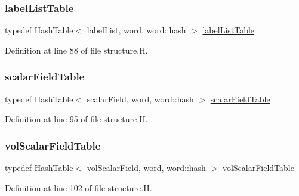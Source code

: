 \subsubsection{\texorpdfstring{label\+List\+Table}{labelListTable}}
{\footnotesize\ttfamily typedef Hash\+Table$<$ label\+List, word, word\+::hash $>$ \hyperlink{classFoam_1_1structure_afefd20eeb8d2675bfba9c1ce9aa78ca7}{label\+List\+Table}\hspace{0.3cm}{\ttfamily [protected]}}



Definition at line 88 of file structure.\+H.

\mbox{\label{classFoam_1_1structure_a2fdb5cf3126746b10e53fb86215f3249}} 
\subsubsection{\texorpdfstring{scalar\+Field\+Table}{scalarFieldTable}}
{\footnotesize\ttfamily typedef Hash\+Table$<$ scalar\+Field, word, word\+::hash $>$ \hyperlink{classFoam_1_1structure_a2fdb5cf3126746b10e53fb86215f3249}{scalar\+Field\+Table}\hspace{0.3cm}{\ttfamily [protected]}}



Definition at line 95 of file structure.\+H.

\mbox{\label{classFoam_1_1structure_a821486e30c5f9ed2852aeddc4ff8ff30}} 
\subsubsection{\texorpdfstring{vol\+Scalar\+Field\+Table}{volScalarFieldTable}}
{\footnotesize\ttfamily typedef Hash\+Table$<$ vol\+Scalar\+Field, word, word\+::hash $>$ \hyperlink{classFoam_1_1structure_a821486e30c5f9ed2852aeddc4ff8ff30}{vol\+Scalar\+Field\+Table}\hspace{0.3cm}{\ttfamily [protected]}}



Definition at line 102 of file structure.\+H.

